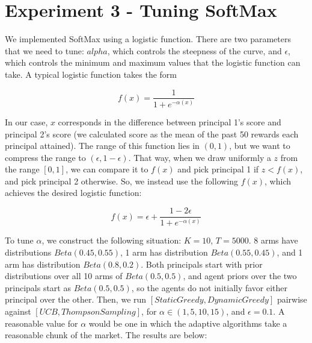 \documentclass[11pt,letterpaper]{article}
\begin{document}
\section*{Experiment 3 - Tuning SoftMax}
We implemented SoftMax using a logistic function. There are two parameters that we need to tune: $alpha$, which controls the steepness of the curve, and $\epsilon$, which controls the minimum and maximum values that the logistic function can take. A typical logistic function takes the form 

\[f(x)=\frac{1}{1+e^{-\alpha(x)}}\]

In our case, $x$ corresponds in the difference between principal 1's score and principal 2's score (we calculated score as the mean of the past 50 rewards each principal attained). The range of this function lies in $(0,1)$, but we want to compress the range to $(\epsilon, 1-\epsilon)$. That way, when we draw uniformly a $z$ from the range $[0,1]$, we can compare it to $f(x)$ and pick principal 1 if $z<f(x)$, and pick principal 2 otherwise. So, we instead use the following $f(x)$, which achieves the desired logistic function:

\[f(x)=\epsilon + \frac{1-2\epsilon}{1+e^{-\alpha(x)}}\]

To tune $\alpha$, we construct the following situation: $K=10$, $T=5000$. 8 arms have distributions $Beta(0.45, 0.55)$, 1 arm has distribution $Beta(0.55, 0.45)$, and 1 arm has distribution $Beta(0.8, 0.2)$. Both principals start with prior distributions over all 10 arms of $Beta(0.5, 0.5)$, and agent priors over the two principals start as $Beta(0.5, 0.5)$, so the agents do not initially favor either principal over the other. Then, we run $[StaticGreedy, DynamicGreedy]$ pairwise against $[UCB, ThompsonSampling]$, for $\alpha \in (1, 5, 10, 15)$, and $\epsilon=0.1$. A reasonable value for $\alpha$ would be one in which the adaptive algorithms take a reasonable chunk of the market. The results are below:
\end{document}
